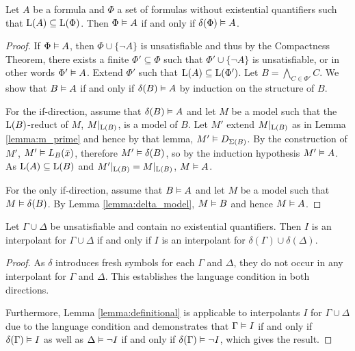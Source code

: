 \begin{lemma}
	\label{lemma:definitional}
	Let $A$ be a formula and $\Phi$ a set of formulas without existential quantifiers such that $\operatorname{L}(A) \subseteq \operatorname{L}(\Phi)$.
	Then $\Phi \vDash A$ if and only if $\delta(\Phi) \vDash A$.
\end{lemma}
\begin{proof}
	If $\Phi \vDash A$, then $\Phi \cup \{\lnot A\}$ is unsatisfiable and thus by the Compactness Theorem,
	there exists a finite $\Phi' \subseteq \Phi$ such that $\Phi' \cup \{\lnot A\}$ is unsatisfiable, or in other words $\Phi' \vDash A$.
	Extend $\Phi'$ such that $\operatorname{L}(A) \subseteq \operatorname{L}(\Phi')$.
	Let $B = \bigwedge_{C\in \Phi'} C$.
	We show that $B \vDash A$ if and only if $\delta(B) \vDash A$ by induction on the structure of\nolinebreak{} $B$.

	For the if-direction, assume that $\delta(B) \vDash A$ and let $M$ be a model 
	such that the $\operatorname{L}(B)$-reduct of $M$, $M|_{\operatorname{L}(B)}$, is a model of $B$.
	Let $M'$ extend $M|_{\operatorname{L}(B)}$ as in Lemma \ref{lemma:m_prime} and hence by that lemma, $M' \vDash D_{\Sigma(B)}$.
	By the construction of $M'$, $M' \vDash L_B(\bar x)$, therefore $M' \vDash \delta(B)$, so by the induction hypothesis $M' \vDash A$. 
	As $\operatorname{L}(A) \subseteq \operatorname{L}(B)$ and $M'|_{\operatorname{L}(B)} = M|_{\operatorname{L}(B)}$, $M \vDash A$.

	For the only if-direction, assume that $B \vDash A$ and let $M$ be a model such that $M\vDash \delta(B)$.  
	By Lemma \ref{lemma:delta_model}, $M\vDash B$ and hence $M\vDash A$.
\end{proof}


\begin{prop}
	\label{prop:delta_interpolant}
	Let $\Gamma \cup \Delta$ be unsatisfiable and contain no existential quantifiers.
	Then $I$ is an interpolant for \mbox{$\Gamma \cup \Delta$} if and only if 
	$I$ is an interpolant for $\delta(\Gamma) \cup \delta(\Delta)$.
\end{prop}
\begin{proof}
	As $\delta$ introduces fresh symbols for each $\Gamma$ and $\Delta$, they do not occur in any interpolant for $\Gamma$ and $\Delta$. 
	This establishes the language condition in both directions.

	Furthermore, Lemma \ref{lemma:definitional} is applicable to interpolants $I$ for $\Gamma \cup \Delta$ due to the language condition and demonstrates that
	$\Gamma \vDash I$ if and only if $\delta(\Gamma) \vDash I$
	as well as
	$\Delta \vDash \lnot I$ if and only if $\delta(\Gamma) \vDash \lnot I$, which gives the result.
\end{proof}


